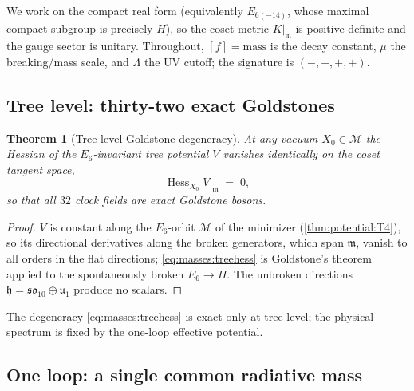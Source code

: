 \documentclass[11pt]{article}
\theoremstyle{plain}
\newtheorem{theorem}{Theorem}[section]
\theoremstyle{definition}
\theoremstyle{remark}
\begin{document}
We work on the compact real form (equivalently $E_{6(-14)}$, whose maximal
compact subgroup is precisely $H$), so the coset metric $K|_{\mathfrak m}$ is
positive-definite and the gauge sector is unitary. Throughout, $[f]=\text{mass}$
is the decay constant, $\mu$ the breaking/mass scale, and $\Lambda$ the UV
cutoff; the signature is $(-,+,+,+)$.

\subsection{Tree level: thirty-two exact Goldstones}
\label{sec:masses:tree}

\begin{theorem}[Tree-level Goldstone degeneracy]\label{thm:masses:tree}
At any vacuum $X_{0}\in\mathcal{M}$ the Hessian of the $E_{6}$-invariant
tree potential $V$ vanishes identically on the coset tangent space,
\begin{equation}\label{eq:masses:treehess}
  \operatorname{Hess}_{X_{0}}V\big|_{\mathfrak m} \;=\; 0,
\end{equation}
so that all $32$ clock fields are exact Goldstone bosons.
\end{theorem}

\begin{proof}
$V$ is constant along the $E_{6}$-orbit $\mathcal{M}$ of the minimizer
(\autoref{thm:potential:T4}), so its directional derivatives along the
broken generators, which span $\mathfrak m$, vanish to all orders in the
flat directions; \eqref{eq:masses:treehess} is Goldstone's theorem applied to
the spontaneously broken $E_{6}\to H$. The unbroken directions
$\mathfrak h=\mathfrak{so}_{10}\oplus\mathfrak u_{1}$ produce no scalars.
\end{proof}

The degeneracy \eqref{eq:masses:treehess} is exact only at tree level; the
physical spectrum is fixed by the one-loop effective potential.

\subsection{One loop: a single common radiative mass}
\label{sec:masses:oneloop}
\end{document}
